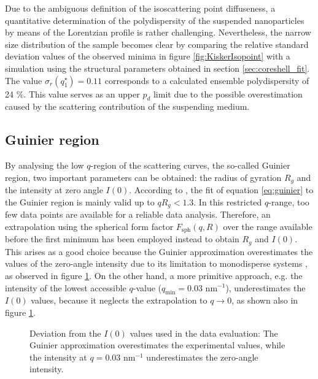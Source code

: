 Due to the ambiguous definition of the isoscattering point diffuseness, a quantitative determination of the polydispersity of the suspended nanoparticles by means of the Lorentzian profile is rather challenging. Nevertheless, the narrow size distribution of the sample becomes clear by comparing the relative standard deviation values of the observed minima in figure \ref{fig:KiskerIsopoint} with a simulation using the structural parameters obtained in section \ref{sec:coreshell_fit}. The value \( \sigma_r(q^{\star}_1)=0.11 \) corresponds to a calculated ensemble polydispersity of 24 $\%$. This value serves as an upper \( p_d \) limit due to the possible overestimation caused by the scattering contribution of the suspending medium.


\subsection{Guinier region}
\label{sec:guinier_analysis}
By analysing the low \(q \)-region of the scattering curves, the so-called Guinier region, two important parameters can be obtained: the radius of gyration \(R_g\) and the intensity at zero angle \(I(0)\). According to \cite{feigin_structure_1987}, the fit of equation \eqref{eq:guinier} to the Guinier region is mainly valid up to \( qR_g<1.3 \). In this restricted \(q\)-range, too few data points are available for a reliable data analysis. Therefore, an extrapolation using the spherical form factor \( F_{\text{sph}}(q,R) \) over the range available before the first minimum has been employed instead to obtain \(R_g\) and \(I(0)\). This arises as a good choice because the Guinier approximation overestimates the values of the zero-angle intensity due to its limitation to monodisperse systems \citep{feigin_structure_1987}, as observed in figure \ref{fig:KiskerIntensityComparison}. On the other hand, a more primitive approach, e.g. the intensity of the lowest accessible $q$-value ($q_{\text{min}}=0.03$ nm$^{-1}$), underestimates the $I(0)$ values, because it neglects the extrapolation to $q\rightarrow0$, as shown also in figure \ref{fig:KiskerIntensityComparison}.

\begin{figure}%
	\centering
		
		\caption[Deviation from the $I(0)$ used in the evaluation of the PS-COOH particles experimental data.]{Deviation from the $I(0)$ values used in the data evaluation: The Guinier approximation overestimates the experimental values, while the intensity at $q=0.03$ nm$^{-1}$ underestimates the zero-angle intensity.}
		\label{fig:KiskerIntensityComparison}
\end{figure}

